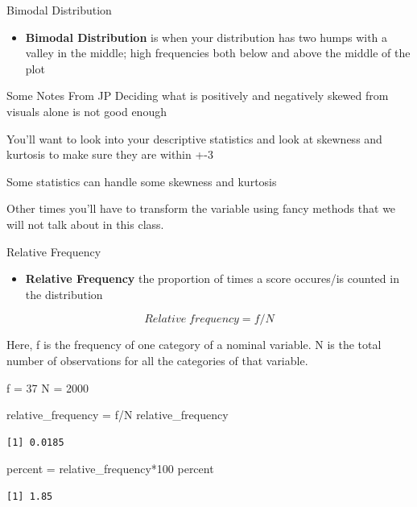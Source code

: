 \documentclass[
  ignorenonframetext,
]{beamer}
\newenvironment{Shaded}{\begin{snugshade}}{\end{snugshade}}
\newcommand{\DecValTok}[1]{\textcolor[rgb]{0.68,0.00,0.00}{#1}}
\newcommand{\NormalTok}[1]{\textcolor[rgb]{0.00,0.23,0.31}{#1}}
\newcommand{\OtherTok}[1]{\textcolor[rgb]{0.00,0.23,0.31}{#1}}
\newcommand{\SpecialCharTok}[1]{\textcolor[rgb]{0.37,0.37,0.37}{#1}}
\providecommand{\tightlist}{%
  \setlength{\itemsep}{0pt}\setlength{\parskip}{0pt}}\usepackage{longtable,booktabs,array}
\begin{document}
\begin{frame}{Bimodal Distribution}
\label{bimodal-distribution}
\begin{itemize}
\tightlist
\item
  \textbf{Bimodal Distribution} is when your distribution has two humps
  with a valley in the middle; high frequencies both below and above the
  middle of the plot
\end{itemize}
\end{frame}

\begin{frame}{Some Notes From JP}
\label{some-notes-from-jp}
Deciding what is positively and negatively skewed from visuals alone is
not good enough

You'll want to look into your descriptive statistics and look at
skewness and kurtosis to make sure they are within +-3

Some statistics can handle some skewness and kurtosis

Other times you'll have to transform the variable using fancy methods
that we will not talk about in this class.
\end{frame}

\begin{frame}[fragile]{Relative Frequency}
\label{relative-frequency}
\begin{itemize}
\tightlist
\item
  \textbf{Relative Frequency} the proportion of times a score occures/is
  counted in the distribution
\end{itemize}

\[ Relative\;frequency = f/N\]

Here, f is the frequency of one category of a nominal variable. N is the
total number of observations for all the categories of that variable.

\begin{Shaded}
\begin{Highlighting}[]
\NormalTok{f }\OtherTok{=} \DecValTok{37}
\NormalTok{N }\OtherTok{=} \DecValTok{2000}

\NormalTok{relative\_frequency }\OtherTok{=}\NormalTok{ f}\SpecialCharTok{/}\NormalTok{N}
\NormalTok{relative\_frequency}
\end{Highlighting}
\end{Shaded}

\begin{verbatim}
[1] 0.0185
\end{verbatim}

\begin{Shaded}
\begin{Highlighting}[]
\NormalTok{percent }\OtherTok{=}\NormalTok{ relative\_frequency}\SpecialCharTok{*}\DecValTok{100}
\NormalTok{percent}
\end{Highlighting}
\end{Shaded}

\begin{verbatim}
[1] 1.85
\end{verbatim}
\end{frame}
\end{document}
